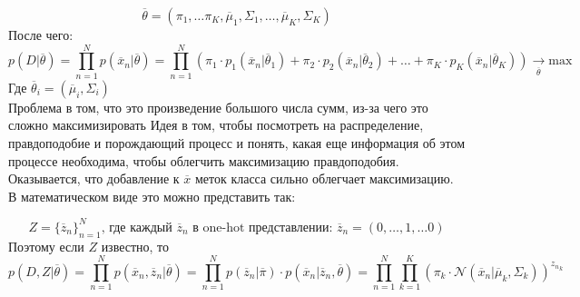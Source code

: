 \[\overline{\theta} = (\pi_1, \dots \pi_K,
\overline{\mu}_1, \Sigma_1, \dots, \overline{\mu}_K, \Sigma_K)\] 
После чего:
\[p(D|\overline{\theta}) = \prod\limits_{n=1}^N p(\overline{x}_n | \overline{\theta}) =
 \prod\limits_{n=1}^N (\pi_1\cdot p_1(\overline{x}_n | \overline{\theta}_1) + \pi_2\cdot p_2(\overline{x}_n | \overline{\theta}_2) + 
 \dots + \pi_K\cdot p_K(\overline{x}_n | \overline{\theta}_K) ) \overset{}{\underset{\overline{\theta}}{\rightarrow}} \text{max}\]
 Где $\overline{\theta}_i = (\overline{\mu}_i, \Sigma_i)$
\\
Проблема в том, что это произведение большого числа сумм, из-за чего это сложно максимизировать
Идея в том, чтобы посмотреть на распределение, правдоподобие и порождающий процесс и понять, какая еще информация об этом процессе необходима, чтобы
облегчить максимизацию правдоподобия.
\\
Оказывается, что добавление к $\overline{x}$ меток класса сильно облегчает максимизацию. В математическом виде это можно представить так:

\[ Z = \{\overline{z}_n \} _{n=1}^N \text{, где каждый } \overline{z}_n \text{ в one-hot представлении: } \overline{z}_n = (0,\dots,1,\dots0)\] 
Поэтому если $Z$ известно, то
\[p(D, Z | \overline{\theta}) = \prod\limits_{n=1}^{N}p(\overline{x}_n, \overline{z}_n | \overline{\theta})
= \prod\limits_{n=1}^{N}p(\overline{z}_n | \overline{\pi})\cdot p(\overline{x}_n| \overline{z}_n, \overline{\theta})
= \prod\limits_{n=1}^{N}\prod\limits_{k=1}^{K}{(\pi_k\cdot\mathcal{N}(\overline{x}_n|\overline{\mu}_k,\Sigma_k))}^{{z_n}_k}\]

